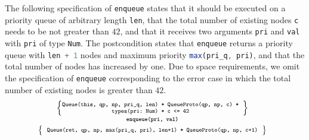 \documentclass{llncs}
\def\jsinline{\lstinline[language=JavaScript, basicstyle=\small]}
\begin{document}
The following specification of \jsinline|enqueue| states that it should be executed on a priority queue 
of arbitrary length \jsinline|len|, that the total number of existing nodes \jsinline|c| needs to be not greater 
than $42$, and that it receives two arguments \jsinline|pri| and
\jsinline|val| with \jsinline|pri|  of type \jsinline|Num|. 
The postcondition states that \jsinline|enqueue| returns a priority queue with \jsinline|len + 1| nodes 
and maximum priority \jsinline|max(pri_q, pri)|, and that the total number of nodes has increased by one. 
Due to space requirements, we omit the specification of \jsinline|enqueue| corresponding to the error case in which the total number of existing nodes is greater than $42$. 
%
\begin{displaymath} 
{\scriptsize
\hspace*{-0.2cm}
\begin{array}{c}
\left\{ 
\begin{minipage}{0.62\textwidth}
\begin{verbatim}
Queue(this, qp, np, pri_q, len) * QueueProto(qp, np, c) *
                types(pri: Num) * c <= 42
\end{verbatim}
\end{minipage}\ \right\} \\[2mm]
\text{\bfseries \texttt{enqueue(pri, val)}} \\[1mm]
\left\{ {\begin{array}{c}
 \text{\texttt{Queue(ret, qp, np, max(pri\_q, pri), len+1) * QueueProto(qp, np, c+1)}} 
\end{array}} \right\} \\
\end{array}}
\end{displaymath}
\end{document}
